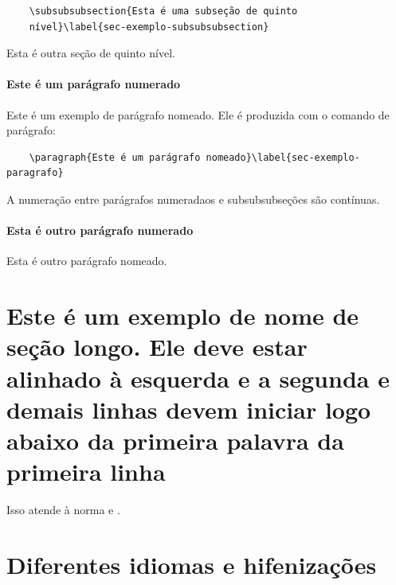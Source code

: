     \begin{verbatim}
    \subsubsubsection{Esta é uma subseção de quinto
    nível}\label{sec-exemplo-subsubsubsection}
    \end{verbatim}

    \label{sec-exemplo-subsubsubsection-outro}

    Esta é outra seção de quinto nível.


    \paragraph{Este é um parágrafo numerado}\label{sec-exemplo-paragrafo}

    Este é um exemplo de parágrafo nomeado. Ele é produzida com o comando de
    parágrafo:

    \begin{verbatim}
    \paragraph{Este é um parágrafo nomeado}\label{sec-exemplo-paragrafo}
    \end{verbatim}

    A numeração entre parágrafos numeradaos e subsubsubseções são contínuas.

    \paragraph{Esta é outro parágrafo numerado}\label{sec-exemplo-paragrafo-outro}

    Esta é outro parágrafo nomeado.

    \section{Este é um exemplo de nome de seção longo. Ele deve estar
    alinhado à esquerda e a segunda e demais linhas devem iniciar logo abaixo da
    primeira palavra da primeira linha}

    Isso atende à norma 
     e .

    \section{Diferentes idiomas e hifenizações}
    \label{sec-hifenizacao}

